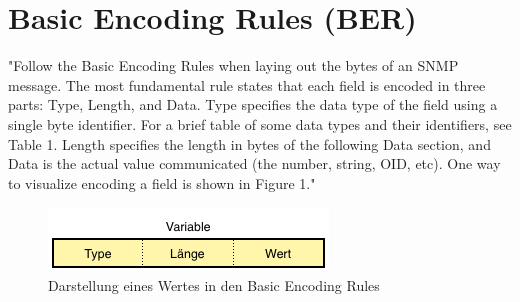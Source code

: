 \documentclass[11pt,a4paper]{article}
\begin{document}
\section*{Basic Encoding Rules (BER)}
\color{red}
"Follow the Basic Encoding Rules when laying out the bytes of an SNMP message. The most fundamental rule states that each field is encoded in three parts: Type, Length, and Data. Type specifies the data type of the field using a single byte identifier. For a brief table of some data types and their identifiers, see Table 1. Length specifies the length in bytes of the following Data section, and Data is the actual value communicated (the number, string, OID, etc). One way to visualize encoding a field is shown in Figure 1."
\cite{basicEncodingRules}
\color{black}
\linebreak
\begin{figure}[h]
	\centering
	\includegraphics[scale=1]{Bilder/BasicEncodingRules}
	\caption{Darstellung eines Wertes in den Basic Encoding Rules}
\end{figure}
\end{document}
